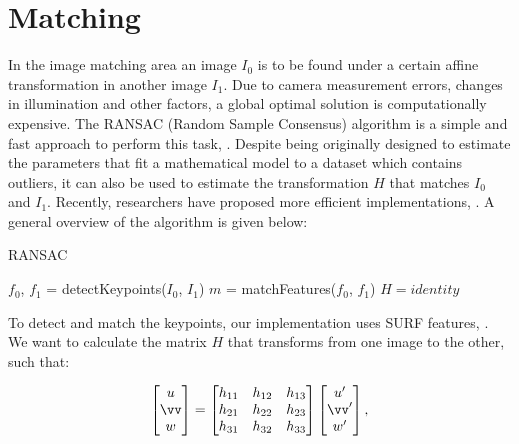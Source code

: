 \documentclass[12pt]{article}
\begin{document}
\FloatBarrier %
\section{Matching}

In the image matching area an image $I_0$ is to be found under a certain affine transformation in another image $I_1$.
Due to camera measurement errors, changes in illumination and other factors, a global optimal solution is computationally expensive.
The RANSAC (Random Sample Consensus) algorithm is a simple and fast approach to perform this task, \cite{Fischler1981}.
Despite being originally designed to estimate the parameters that fit a mathematical model to a dataset which contains outliers, it can also be used to estimate the transformation $H$ that matches $I_0$ and $I_1$.
Recently, researchers have proposed more efficient implementations, \cite{Dung2013}.
A general overview of the algorithm is given below:

\begin{algorithm}[H]
 \caption{RANSAC}
 $f_0$, $f_1$ = detectKeypoints($I_0$, $I_1$)\;
 $m$ = matchFeatures($f_0$, $f_1$)\;
 $H = identity$\;
\end{algorithm}

To detect and match the keypoints, our implementation uses SURF features, \cite{Bay2006}.
We want to calculate the matrix $H$ that transforms from one image to the other, such that:

\begin{equation}
\begin{bmatrix}
u \\ 
\vv \\ 
w
\end{bmatrix}
= 
\begin{bmatrix}
 h_{11} & h_{12} & h_{13} \\ 
 h_{21} & h_{22} & h_{23}\\ 
 h_{31} & h_{32} & h_{33}
\end{bmatrix}
\begin{bmatrix}
u' \\
\vv' \\
w'
\end{bmatrix},
\label{eq:originalH}
\end{equation}
\end{document}
